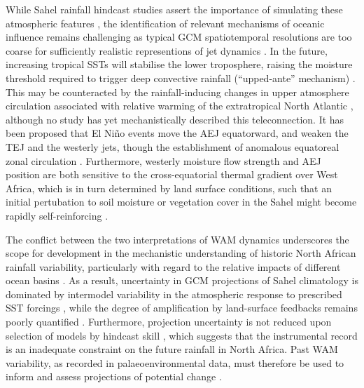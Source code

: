 \documentclass[a4paper]{article}
\begin{document}
While Sahel rainfall hindcast studies assert the importance of simulating these atmospheric features \parencite{philippon2010skill, xue2010intercomparison, ruti2011west, diallo2013interannual}, the identification of relevant mechanisms of oceanic influence remains challenging as typical GCM spatiotemporal resolutions are too coarse for sufficiently realistic representions of jet dynamics \parencite{caminade2010twentieth, druyan2011studies, tseng2016diagnosing, vellinga2016sahel, whittleston2017climate}.
In the future, increasing tropical SSTs will stabilise the lower troposphere, raising the moisture threshold required to trigger deep convective rainfall (``upped-ante'' mechanism) \parencite{neelin2003tropical, caminade2010twentieth, liu2014atmospheric}. 
This may be counteracted by the rainfall-inducing changes in upper atmosphere circulation associated with relative warming of the extratropical North Atlantic \parencite{liu2014atmospheric, martin2014impact, park2015northern, monerie2016range}, although no study has yet mechanistically described this teleconnection.
It has been proposed that El Ni\~{n}o events move the AEJ equatorward, and weaken the TEJ and the westerly jets, though the establishment of anomalous equatoreal zonal circulation \parencite{joly2009influence, okonkwo2015combined, villamayor2015robust, preethi2015impacts}.
Furthermore, westerly moisture flow strength and AEJ position are both sensitive to the cross-equatorial thermal gradient over West Africa, which is in turn determined by land surface conditions, such that an initial pertubation to soil moisture or vegetation cover in the Sahel might become rapidly self-reinforcing \parencite{cook1999generation, thorncroft1999maintenance, patricola2008atmosphere, pu2012role, liu2014atmospheric, berg2017soil}.

The conflict between the two interpretations of WAM dynamics underscores the scope for development in the mechanistic understanding of historic North African rainfall variability, particularly with regard to the relative impacts of different ocean basins \parencite{lafore2011progress, roehrig2013present, nicholson2013west, rodriguez2015variability, martin2016understanding}.
As a result, uncertainty in GCM projections of Sahel climatology is dominated by intermodel variability in the atmospheric response to prescribed SST forcings \parencite{cook2006coupled, druyan2011studies, roehrig2013present, lee2014future, chadwick2016aspects}, while the degree of amplification by land-surface feedbacks remains poorly quantified \parencite{nicholson2000land, taylor2011new}. 
Furthermore, projection uncertainty is not reduced upon selection of models by hindcast skill \parencite{rowell2016can}, which suggests that the instrumental record is an inadequate constraint on the future rainfall in North Africa.
Past WAM variability, as recorded in palaeoenvironmental data, must therefore be used to inform and assess projections of potential change \parencite{braconnot2012evaluation, mohtadi2016palaeoclimatic}.
\end{document}
